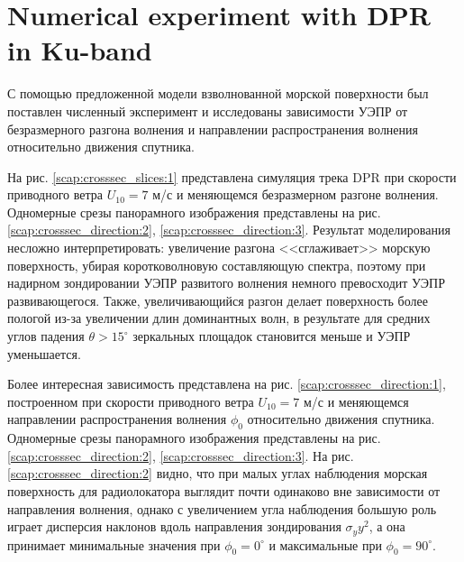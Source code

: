 \documentclass{article}
\begin{document}





\section{Numerical experiment with DPR in Ku-band}%

С помощью предложенной модели взволнованной морской поверхности был поставлен
численный эксперимент и исследованы зависимости УЭПР от безразмерного разгона
волнения и направлении распространения волнения относительно движения
спутника.

На рис.  \ref{scap:crosssec_slices:1} представлена симуляция трека DPR при
скорости приводного ветра $U_{10}=7$ м/с и меняющемся безразмерном разгоне
волнения. Одномерные срезы панорамного
изображения  представлены на рис. \ref{scap:crosssec_direction:2},
\ref{scap:crosssec_direction:3}. Результат моделирования несложно
интерпретировать: увеличение разгона <<сглаживает>> морскую поверхность, убирая
коротковолновую составляющую спектра, поэтому при надирном зондировании УЭПР
развитого волнения немного превосходит УЭПР развивающегося. 
Также, увеличивающийся разгон делает поверхность более пологой
из-за увеличении длин доминантных волн, в результате
для средних углов падения  $\theta > 15^{\circ}$  зеркальных площадок
становится меньше и УЭПР уменьшается. 


Более интересная зависимость представлена на рис.
\ref{scap:crosssec_direction:1}, построенном при скорости приводного ветра $U_{10}=7$ м/с и меняющемся направлении распространения волнения
$\phi_0$ относительно движения спутника. Одномерные срезы панорамного
изображения  представлены на рис. \ref{scap:crosssec_direction:2},
\ref{scap:crosssec_direction:3}. На рис. \ref{scap:crosssec_direction:2} видно,
что при малых углах наблюдения морская поверхность для радиолокатора выглядит
почти одинаково вне зависимости от направления волнения, однако с увеличением
угла наблюдения большую роль играет дисперсия наклонов вдоль направления
зондирования $\sigma_yy^2$, а она принимает минимальные значения при
$\phi_0=0^{\circ}$  и максимальные при $\phi_0 = 90^{\circ}$. 
\end{document}
